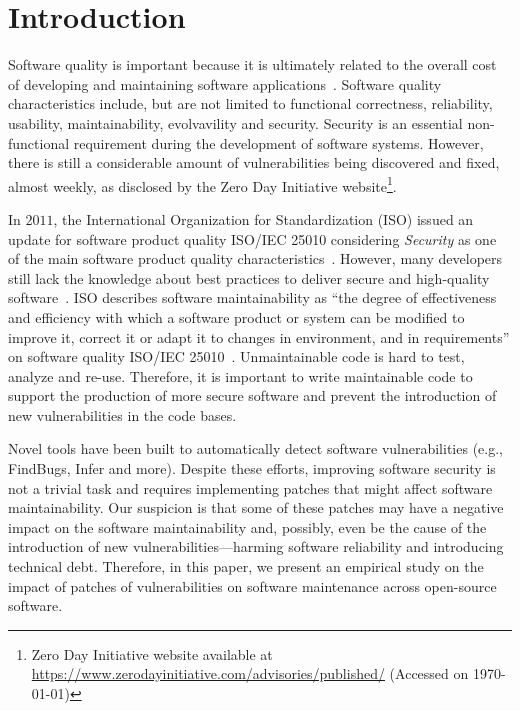 \documentclass[smallextended]{svjour3}       %
\begin{document}
\section{Introduction}
%
Software quality is important because it is ultimately related to the overall
cost of developing and maintaining software applications~\cite{slaughter1998evaluating}. 
Software quality characteristics include, but are not limited to functional correctness,
reliability, usability, maintainability, evolvavility and security. Security is an 
essential non-functional requirement during the development of software systems. 
However, there is still a considerable amount of vulnerabilities being
discovered and fixed, almost weekly, as disclosed by the Zero Day Initiative
website\footnote{Zero Day Initiative website available at
\url{https://www.zerodayinitiative.com/advisories/published/} (Accessed on \today{})}.

In $2011$, the International Organization for Standardization (ISO) issued an
update for software product quality ISO/IEC 25010 considering \emph{Security} 
as one of the main software product quality characteristics~\cite{iso:2011}. 
However, many developers still lack the knowledge about best practices to deliver 
secure and high-quality software~\cite{Pothamsetty:2005:SEL:1107622.1107635,8077802}.
ISO describes software maintainability as ``the degree of effectiveness and
efficiency with which a software product or system can be modified to improve
it, correct it or adapt it to changes in environment, and in requirements'' on
software quality ISO/IEC 25010~\cite{iso:2011}. 
Unmaintainable code is hard to test, analyze and re-use. Therefore, 
it is important to write maintainable code to support the production 
of more secure software and prevent 
the introduction of new vulnerabilities in the code bases. 

Novel tools have been built to automatically detect software vulnerabilities (e.g., FindBugs, Infer and more). 
Despite these efforts, improving software security is not a trivial task and requires 
implementing patches that might affect software maintainability. 
Our suspicion is that some of these patches may have a negative 
impact on the software maintainability and, possibly, even be the cause of the 
introduction of new vulnerabilities---harming software reliability and introducing technical debt. Therefore, 
in this paper, we present an empirical study on the impact of patches of 
vulnerabilities on software maintenance across open-source software.
\end{document}
